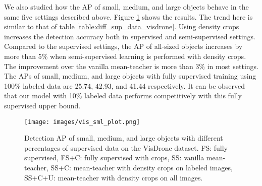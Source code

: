 \begin{table*}
    \caption{Performance comparison of our density crop guided semi-supervised object detection with 1\%, 5\%, and 10\% labeled images on the VisDrone dataset. SSOD - semi-supervised detection with mean-teacher, Crop(L) - density crops on the labeled images, Crop (L + U) - density crops on the labeled and unlabeled images.}
    \centering
    \label{table:diff_sup_data_visdrone}
\end{table*}

We also studied how the AP of small, medium, and large objects behave in the same five settings described above. Figure \ref{fig:vis_sml} shows the results. The trend here is similar to that of table \ref{table:diff_sup_data_visdrone}. Using density crops increases the detection accuracy both in supervised and semi-supervised settings. Compared to the supervised settings, the AP of all-sized objects increases by more than 5\% when semi-supervised learning is performed with density crops. The improvement over the vanilla mean-teacher is more than 3\% in most settings. The APs of small, medium, and large objects with fully supervised training using 100\% labeled data are 25.74, 42.93, and 41.44 respectively. It can be observed that our model with 10\% labeled data performs competitively with this fully supervised upper bound. 


\begin{figure}[t]
  \centering
  \texttt{[image: images/vis\_sml\_plot.png]} 
  \caption{Detection AP of small, medium, and large objects with different percentages of supervised data on the VisDrone dataset. FS: fully supervised, FS+C: fully supervised with crops, SS: vanilla mean-teacher, SS+C: mean-teacher with density crops on labeled images, SS+C+U: mean-teacher with density crops on all images.}
  \label{fig:vis_sml}
\end{figure}

